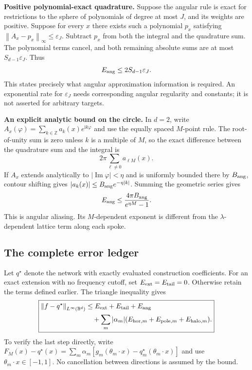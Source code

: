 \documentclass[11pt]{article}
\newcommand{\ii}{\mathrm i}
\newcommand{\Imag}{\operatorname{Im}}
\newcommand{\norm}[1]{\left\lVert#1\right\rVert}
\begin{document}
\textbf{Positive polynomial-exact quadrature.} Suppose the angular rule is exact for restrictions to the sphere of polynomials of degree at most $J$, and its weights are positive. Suppose for every $x$ there exists such a polynomial $p_x$ satisfying $\norm{A_x-p_x}_\infty\le\varepsilon_J$. Subtract $p_x$ from both the integral and the quadrature sum. The polynomial terms cancel, and both remaining absolute sums are at most $S_{d-1}\varepsilon_J$. Thus
\begin{equation}
 E_{\rm ang}\le2S_{d-1}\varepsilon_J.
 \label{eq:angular-poly-bound}
\end{equation}
This states precisely what angular approximation information is required. An exponential rate for $\varepsilon_J$ needs corresponding angular regularity and constants; it is not asserted for arbitrary targets.

\textbf{An explicit analytic bound on the circle.} In $d=2$, write
$A_x(\varphi)=\sum_{k\in\mathbb Z}a_k(x)e^{\ii k\varphi}$ and use the equally spaced $M$-point rule. The root-of-unity sum is zero unless $k$ is a multiple of $M$, so the exact difference between the quadrature sum and the integral is
\[
 2\pi\sum_{\ell\ne0}a_{\ell M}(x).
\]
If $A_x$ extends analytically to $|\Imag\varphi|<\eta$ and is uniformly bounded there by $B_{\rm ang}$, contour shifting gives $|a_k(x)|\le B_{\rm ang}e^{-\eta|k|}$. Summing the geometric series gives
\begin{equation}
 E_{\rm ang}\le\frac{4\pi B_{\rm ang}}{e^{\eta M}-1}.
 \label{eq:angular-2d}
\end{equation}
This is angular aliasing. Its $M$-dependent exponent is different from the $\lambda$-dependent lattice term along each spoke.

\subsection{The complete error ledger}

Let $q^\star$ denote the network with exactly evaluated construction coefficients. For an exact extension with no frequency cutoff, set $E_{\rm ext}=E_{\rm tail}=0$. Otherwise retain the terms defined earlier. The triangle inequality gives
\begin{equation}
 \boxed{\begin{aligned}
 \norm{f-q^\star}_{L^\infty(\mathbb B^d)}
 &\le E_{\rm ext}+E_{\rm tail}+E_{\rm ang}\\
 &\quad+\sum_m|\alpha_m|
 (E_{{\rm hor},m}+E_{{\rm pole},m}+E_{{\rm halo},m}).
 \end{aligned}}
 \label{eq:total-error}
\end{equation}
To verify the last step directly, write
$F_M(x)-q^\star(x)=\sum_m\alpha_m[g_m(\theta_m\cdot x)-q_m^\star(\theta_m\cdot x)]$ and use $\theta_m\cdot x\in[-1,1]$. No cancellation between directions is assumed by the bound.
\end{document}
